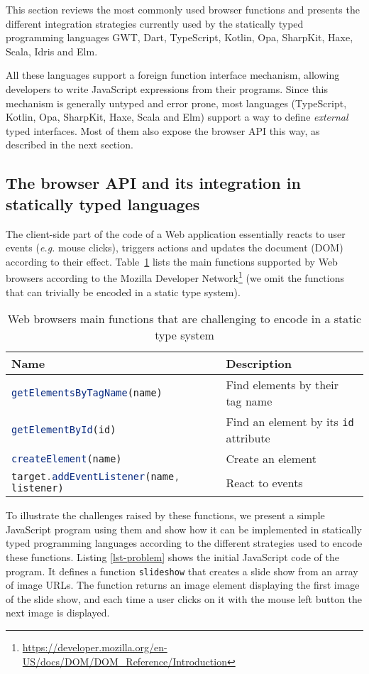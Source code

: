 \documentclass{llncs}
\newcommand{\jscode}[1]{\lstinline[language=JavaScript]|#1|}
\begin{document}
This section reviews the most commonly used browser functions and presents the different integration strategies currently used by the statically typed programming languages GWT, Dart, TypeScript, Kotlin, Opa, SharpKit, Haxe, Scala, Idris and Elm.

All these languages support a foreign function interface mechanism, allowing developers to write JavaScript expressions from their programs. Since this mechanism is generally untyped and error prone, most languages (TypeScript, Kotlin, Opa, SharpKit, Haxe, Scala and Elm) support a way to define \emph{external} typed interfaces. Most of them also expose the browser API this way, as described in the next section.

\subsection{The browser API and its integration in statically typed languages}

The client-side part of the code of a Web application essentially reacts to user events (\emph{e.g.} mouse clicks), triggers actions and updates the document (DOM) according to their effect. Table~\ref{table-dom-api} lists the main functions supported by Web browsers according to the Mozilla Developer Network\footnote{\href{https://developer.mozilla.org/en-US/docs/DOM/DOM\_Reference/Introduction}{https://developer.mozilla.org/en-US/docs/DOM/DOM\_Reference/Introduction}} (we omit the functions that can trivially be encoded in a static type system).

\begin{table}
 \centering
 \begin{tabular}{ll}
  \hline
  Name & Description \\
  \hline
  \jscode{getElementsByTagName(name)} & Find elements by their tag name \\
  \jscode{getElementById(id)} & Find an element by its \jscode{id} attribute \\
  \jscode{createElement(name)} & Create an element \\
  \jscode{target.addEventListener(name, listener)} & React to events \\
  \hline
 \end{tabular}

 \label{table-dom-api}
 \caption{Web browsers main functions that are challenging to encode in a static type system}
\end{table}

To illustrate the challenges raised by these functions, we present a simple JavaScript program using them and show how it can be implemented in statically typed programming languages according to the different strategies used to encode these functions. Listing \ref{lst-problem} shows the initial JavaScript code of the program. It defines a function \jscode{slideshow} that creates a slide show from an array of image URLs. The function returns an image element displaying the first image of the slide show, and each time a user clicks on it with the mouse left button the next image is displayed.
\end{document}
